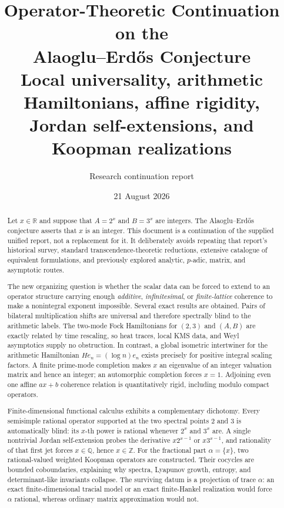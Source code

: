 \documentclass[11pt,oneside]{article}
\title{\textbf{Operator-Theoretic Continuation on the\\
Alaoglu--Erd\H{o}s Conjecture}\\[0.5em]
\large Local universality, arithmetic Hamiltonians, affine rigidity,\\
Jordan self-extensions, and Koopman realizations}
\author{Research continuation report}
\date{21 August 2026}
\theoremstyle{definition}
\theoremstyle{remark}
\newcommand{\Z}{\mathbb Z}
\newcommand{\Q}{\mathbb Q}
\newcommand{\R}{\mathbb R}
\begin{document}
\maketitle

\begin{abstract}
Let \(x\in\R\) and suppose that \(A=2^x\) and \(B=3^x\) are
integers.  The Alaoglu--Erd\H{o}s conjecture asserts that \(x\) is an
integer.  This document is a continuation of the supplied unified report,
not a replacement for it.  It deliberately avoids repeating that report's
historical survey, standard transcendence-theoretic reductions, extensive
catalogue of equivalent formulations, and previously explored analytic,
\(p\)-adic, matrix, and asymptotic routes.

The new organizing question is whether the scalar data can be forced to
extend to an operator structure carrying enough \emph{additive},
\emph{infinitesimal}, or \emph{finite-lattice} coherence to make a
nonintegral exponent impossible.  Several exact results are obtained.
Pairs of bilateral multiplication shifts are universal and therefore
spectrally blind to the arithmetic labels.  The two-mode Fock Hamiltonians
for \((2,3)\) and \((A,B)\) are exactly related by time rescaling, so heat
traces, local KMS data, and Weyl asymptotics supply no obstruction.  In
contrast, a global isometric intertwiner for the arithmetic Hamiltonian
\(H e_n=(\log n)e_n\) exists precisely for positive integral scaling
factors.  A finite prime-mode completion makes \(x\) an eigenvalue of an
integer valuation matrix and hence an integer; an automorphic completion
forces \(x=1\).  Adjoining even one affine \(ax+b\) coherence relation is
quantitatively rigid, including modulo compact operators.

Finite-dimensional functional calculus exhibits a complementary
dichotomy.  Every semisimple rational operator supported at the two
spectral points \(2\) and \(3\) is automatically blind: its \(x\)-th power
is rational whenever \(2^x\) and \(3^x\) are.  A single nontrivial Jordan
self-extension probes the derivative \(x2^{x-1}\) or \(x3^{x-1}\), and
rationality of that first jet forces \(x\in\Q\), hence \(x\in\Z\).
For the fractional part \(\alpha=\{x\}\), two rational-valued weighted
Koopman operators are constructed.  Their cocycles are bounded
coboundaries, explaining why spectra, Lyapunov growth, entropy, and
determinant-like invariants collapse.  The surviving datum is a projection
of trace \(\alpha\): an exact finite-dimensional tracial model or an exact
finite-Hankel realization would force \(\alpha\) rational, whereas ordinary
matrix approximation would not.


\end{abstract}
\end{document}

